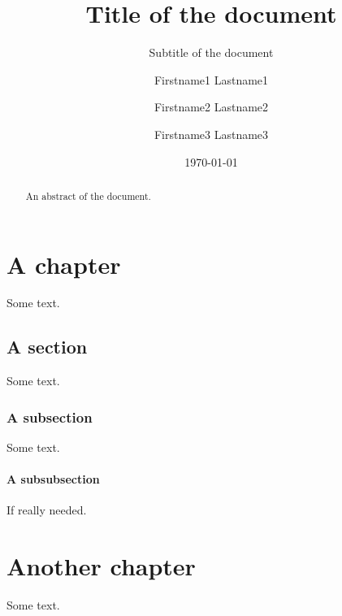 \documentclass[%
	paper=portrait,%
	paper=A4,%
	fontsize=11pt,%
	english,%
]{scrreprt}
\title{Title of the document}
\subtitle{Subtitle of the document}
\author{Firstname1 Lastname1 \and Firstname2 Lastname2 \and Firstname3 Lastname3}
\date{\today}
\begin{document}


\maketitle


\begin{abstract}
	An abstract of the document.
\end{abstract}


\tableofcontents


\chapter{A chapter}

	Some text.


	\section{A section}
	
		Some text.
		
		
		\subsection{A subsection}
		
			Some text.
			
			
			\subsubsection{A subsubsection}
			
				If really needed.



\chapter{Another chapter}

	Some text.
	

\end{document}
